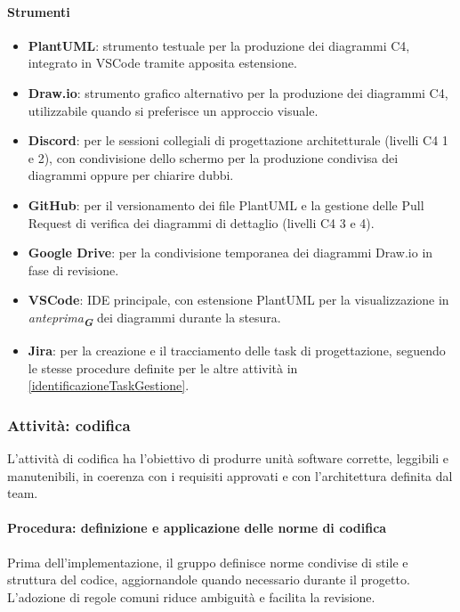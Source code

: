 \documentclass[a4paper,12pt]{article}
\newcommand{\glossario}[1]{\textit{#1}\textsubscript{\textbf{\textit{\textcolor{lightblack}{G}}}}}
\begin{document}
\paragraph{Strumenti}
\begin{itemize}
    \item \textbf{PlantUML}: strumento testuale per la produzione dei diagrammi C4, integrato in VSCode tramite apposita 
    estensione. 
    \item \textbf{Draw.io}: strumento grafico alternativo per la produzione dei diagrammi C4, utilizzabile quando si 
    preferisce un approccio visuale. 
    \item \textbf{Discord}: per le sessioni collegiali di progettazione architetturale (livelli C4 1 e 2), con condivisione dello 
    schermo per la produzione condivisa dei diagrammi oppure per chiarire dubbi.
    \item \textbf{GitHub}: per il versionamento dei file PlantUML e la gestione delle Pull Request di verifica dei diagrammi di dettaglio (livelli C4 3 e 4).
    \item \textbf{Google Drive}: per la condivisione temporanea dei diagrammi Draw.io in fase di revisione.
    \item \textbf{VSCode}: IDE principale, con estensione PlantUML per la visualizzazione in \glossario{anteprima} dei diagrammi durante la stesura.
    \item \textbf{Jira}: per la creazione e il tracciamento delle task di progettazione, seguendo le stesse procedure definite per le 
    altre attività in \ref{identificazioneTaskGestione}.
\end{itemize}

\subsubsection{Attività: codifica}
L'attività di codifica ha l'obiettivo di produrre unità software corrette,
leggibili e manutenibili, in coerenza con i requisiti approvati e con
l'architettura definita dal team.

\paragraph{Procedura: definizione e applicazione delle norme di codifica}
Prima dell'implementazione, il gruppo definisce norme condivise di stile e
struttura del codice, aggiornandole quando necessario durante il progetto.
L'adozione di regole comuni riduce ambiguità e facilita la revisione.
\end{document}
